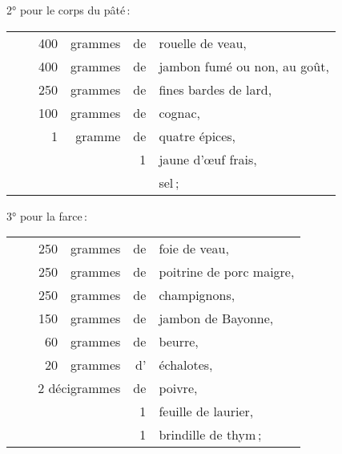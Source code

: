 2° pour le corps du pâté :

\footnotesize
\begin{longtable}{rp{2em}rrrp{16em}}
& & 400 & grammes & de & rouelle de veau,                                                                 \\
& & 400 & grammes & de & jambon fumé ou non, au goût,                                                     \\
& & 250 & grammes & de & fines bardes de lard,                                                            \\
& & 100 & grammes & de & cognac,                                                                          \\
& &   1 & gramme  & de & quatre épices,                                                                   \\
& &     &         &  1 & jaune d'œuf frais,                                                               \\
& &     &         &    & sel ;                                                                            \\
\end{longtable}
\normalsize

3° pour la farce :

\footnotesize
\begin{longtable}{rp{2em}rrrp{16em}}
& & 250 & grammes & de & foie de veau,                                                                    \\
& & 250 & grammes & de & poitrine de porc maigre,                                                         \\
& & 250 & grammes & de & champignons,                                                                     \\
& & 150 & grammes & de & jambon de Bayonne,                                                               \\
& &  60 & grammes & de & beurre,                                                                          \\
& &  20 & grammes & d' & échalotes,                                                                       \\
& \multicolumn{3}{r}{2 décigrammes} & de & poivre,                                                        \\
& &     &         &  1 & feuille de laurier,                                                              \\
& &     &         &  1 & brindille de thym ;                                                              \\
\end{longtable}
\normalsize


